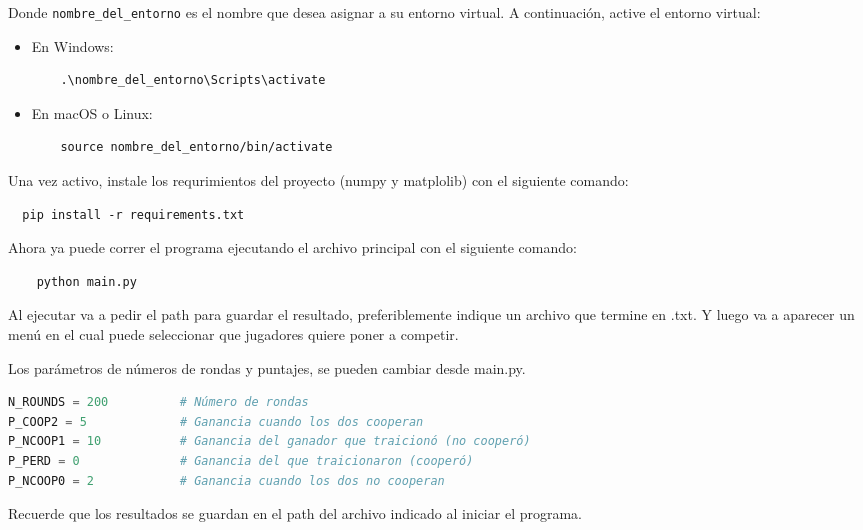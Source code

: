 \documentclass{article}
\begin{document}
Donde \texttt{nombre\_del\_entorno} es el nombre que desea asignar a 
su entorno virtual. 
A continuación, active el entorno virtual:

\begin{itemize}
  \item En Windows:
  \begin{verbatim}
    .\nombre_del_entorno\Scripts\activate
  \end{verbatim}
  \item En macOS o Linux:
  \begin{verbatim}
    source nombre_del_entorno/bin/activate
  \end{verbatim}
\end{itemize}


Una vez activo, instale  los requrimientos del proyecto
(numpy y matplolib) con el siguiente comando:

\begin{verbatim}
  pip install -r requirements.txt
\end{verbatim}


Ahora ya puede correr el programa ejecutando el archivo principal 
con el siguiente comando:

\begin{center}
  \begin{adjustbox}{minipage=\linewidth, center}
  \begin{verbatim}
    python main.py
  \end{verbatim}
  \end{adjustbox}
\end{center}

Al ejecutar va a pedir el path para guardar 
el resultado, 
preferiblemente indique un
archivo que termine en .txt.
Y luego va a
aparecer un menú en el cual puede seleccionar
que jugadores quiere poner a competir.

Los parámetros de números de rondas y puntajes,
se pueden cambiar desde main.py.

\begin{lstlisting}[language=Python]
N_ROUNDS = 200          # Número de rondas
P_COOP2 = 5             # Ganancia cuando los dos cooperan
P_NCOOP1 = 10           # Ganancia del ganador que traicionó (no cooperó)
P_PERD = 0              # Ganancia del que traicionaron (cooperó)
P_NCOOP0 = 2            # Ganancia cuando los dos no cooperan
\end{lstlisting}

Recuerde que los resultados se guardan en el path del archivo
indicado al iniciar el programa.
\end{document}
